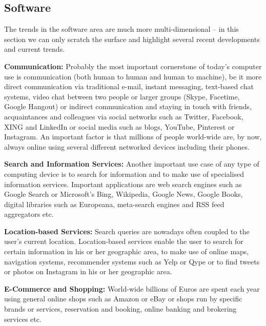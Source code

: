 \documentclass[10pt, plain]{../../metanetpaper}
\begin{document}
\begin{multicols}{2}

\subsection{Software}
\label{sec:software}

The trends in the software area are much more multi-dimensional -- in this section we can only scratch the surface and highlight several recent developments and current trends.

\textbf{Communication:} Probably the most important cornerstone of today's computer use is communication (both human to human and human to machine), be it more direct communication via traditional e-mail, instant messaging, text-based chat systems, video chat between two people or larger groups (Skype, Facetime, Google Hangout) or indirect communication and staying in touch with friends, acquaintances and colleagues via social networks such as Twitter, Facebook, XING and LinkedIn or social media such as blogs, YouTube, Pinterest or Instagram. An important factor is that millions of people world-wide are, by now, always online using several different networked devices including their phones. 

\textbf{Search and Information Services:} Another important use case of any type of computing device is to search for information and to make use of specialised information services. Important applications are web search engines such as Google Search or Microsoft's Bing, Wikipedia, Google News, Google Books, digital libraries such as Europeana, meta-search engines and RSS feed aggregators etc.

\textbf{Location-based Services:} Search queries are nowadays often coupled to the user's current location. Location-based services enable the user to search for certain information in his or her geographic area, to make use of online maps, navigation systems, recommender systems such as Yelp or Qype or to find tweets or photos on Instagram in his or her geographic area.

\textbf{E-Commerce and Shopping:} World-wide billions of Euros are spent each year using general online shops such as Amazon or eBay or shops run by specific brands or services, reservation and booking, online banking and brokering services etc. 


\end{multicols}
\end{document}
